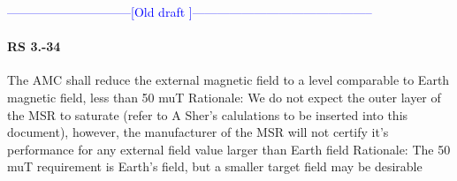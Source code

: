 











\begin{center}
\textcolor{blue}{
------------------------------[Old draft ]--------------------------------------------
}
\end{center}







\paragraph*{RS 3.-34}	The AMC shall reduce the external magnetic field to a level comparable to Earth magnetic field, less than 50 muT 
\newline Rationale: 	
We do not expect the outer layer of the MSR to saturate (refer to A Sher's calulations to be inserted into this document), however, the manufacturer of the MSR will not certify it's performance for any external field value larger than Earth field
\newline Rationale: 	The 50 muT requirement is Earth’s field, but a smaller target field may be desirable
